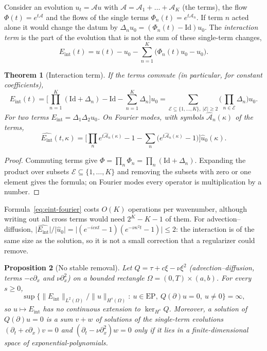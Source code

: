 \documentclass[11pt]{article}
\theoremstyle{plain}
\newtheorem{theorem}{Theorem}[section]
\newtheorem{proposition}[theorem]{Proposition}
\theoremstyle{definition}
\theoremstyle{remark}
\newcommand{\EP}{\mathrm{EP}}               %
\newcommand{\Id}{\mathrm{Id}}
\newcommand{\Eint}{E_{\mathrm{int}}}        %
\newcommand{\flow}{\Phi}                    %
\newcommand{\Hs}{H^{s}}                     %
\newcommand{\abs}[1]{\lvert#1\rvert}
\newcommand{\norm}[1]{\lVert#1\rVert}
\begin{document}
Consider an evolution $u_t=\mathcal Au$ with $\mathcal A=\mathcal A_1+\dots+\mathcal A_K$ (the terms), the flow $\flow(t)=e^{t\mathcal A}$ and the
flows of the single terms $\flow_n(t)=e^{t\mathcal A_n}$. If term $n$ acted alone it would change the datum by
$\Delta_nu_0=(\flow_n(t)-\Id)u_0$. The \emph{interaction term} is the part of the evolution that is not
the sum of these single-term changes,
\begin{equation}\label{eq:eint-def}
  \Eint(t)=u(t)-u_0-\sum_{n=1}^K\big(\flow_n(t)u_0-u_0\big).
\end{equation}

\begin{theorem}[Interaction term]\label{thm:eint}
If the terms commute (in particular, for constant coefficients),
\[
  \Eint(t)=\Big[\prod_{n=1}^K(\Id+\Delta_n)-\Id-\sum_{n=1}^K\Delta_n\Big]u_0
  =\sum_{\mathcal E\subseteq\{1,\dots,K\},\ \abs{\mathcal E}\ge2}\Big(\prod_{n\in\mathcal E}\Delta_n\Big)u_0 .
\]
For two terms $\Eint=\Delta_1\Delta_2u_0$. On Fourier modes, with symbols $\hat{\mathcal A}_n(\kappa)$ of the terms,
\begin{equation}\label{eq:eint-fourier}
  \widehat{\Eint}(t,\kappa)=\Big[\prod_ne^{t\hat{\mathcal A}_n(\kappa)}-1-\sum_n\big(e^{t\hat{\mathcal A}_n(\kappa)}-1\big)\Big]\hat u_0(\kappa).
\end{equation}
\end{theorem}

\begin{proof}
Commuting terms give $\flow=\prod_n\flow_n=\prod_n(\Id+\Delta_n)$. Expanding the product over subsets
$\mathcal E\subseteq\{1,\dots,K\}$ and removing the subsets with zero or one element gives the formula; on
Fourier modes every operator is multiplication by a number.
\end{proof}

Formula~\eqref{eq:eint-fourier} costs $O(K)$ operations per wavenumber, although writing out all
cross terms would need $2^K-K-1$ of them. For advection--diffusion,
$\abs{\widehat{\Eint}}/\abs{\hat u_0}=\abs{(e^{-ic\kappa t}-1)(e^{-\nu\kappa^2t}-1)}\le2$: the interaction
is of the same size as the solution, so it is not a small correction that a regularizer could remove.

\begin{proposition}[No stable removal]\label{prop:discont}\label{thm:noreg}\label{thm:nocont}
Let $Q=\tau+c\xi-\nu\xi^2$ (advection--diffusion, terms $-c\partial_x$ and $\nu\partial_x^2$) on a bounded
rectangle $\Omega=(0,T)\times(a,b)$. For every $s\ge0$,
\[
  \sup\Big\{\norm{\Eint}_{L^2(\Omega)}/\norm{u}_{\Hs(\Omega)}:\ u\in\EP,\ Q(\partial)u=0,\ u\ne0\Big\}=\infty,
\]
so $u\mapsto\Eint$ has no continuous extension to $\ker_{\Hs}Q$. Moreover, a solution of $Q(\partial)u=0$ is a
sum $v+w$ of solutions of the single-term evolutions $(\partial_t+c\partial_x)v=0$ and $(\partial_t-\nu\partial_x^2)w=0$ only
if it lies in a finite-dimensional space of exponential-polynomials.
\end{proposition}
\end{document}

